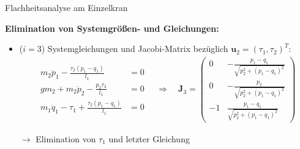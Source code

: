 \documentclass[
	ngerman,
	10pt,				%
	aspectratio=169, 	%
	xcolor=dvipsnames
]{beamer}
\begin{document}
\begin{frame}[t,fragile,label=Flachheit_Einzelkran_1]{\large Flachheitsanalyse am Einzelkran}
	
	\textbf{Elimination von Systemgrößen- und Gleichungen:}
	
	\begin{itemize}
		\item {($i = 3$) Systemgleichungen und Jacobi-Matrix bezüglich $\mathbf{u}_2 = (\tau_1, \tau_2)^T$:}
		\begin{align*}
		\begin{split}
		m_{2} \ddot{p}_{1} - \frac{\tau_{2} \left(p_{1} - q_{1}\right)}{l_{1}} &= 0\\
		g m_{2} + m_{2} \ddot{p}_{2} - \frac{p_{2} \tau_{2}}{l_{1}} &= 0\\
		m_{1} \ddot{q}_{1} - \tau_{1} + \frac{\tau_{2} \left(p_{1} - q_{1}\right)}{l_{1}} &= 0
		\end{split}
		\quad \Rightarrow \quad 
		\mathbf{J}_3 = 
		\left(\begin{matrix}
		0 & - \frac{p_{1} - q_{1}}{\sqrt{p_{2}^{2} + \left(p_{1} - q_{1}\right)^{2}}}\\
		0 & - \frac{p_{2}}{\sqrt{p_{2}^{2} + \left(p_{1} - q_{1}\right)^{2}}}\\
		-1 & \frac{p_{1} - q_{1}}{\sqrt{p_{2}^{2} + \left(p_{1} - q_{1}\right)^{2}}}
		\end{matrix}\right)
		\end{align*}
		\pause
		\item[$\rightarrow$] Elimination von $\tau_1$ und letzter Gleichung	
	\end{itemize}
	
\end{frame}

\end{document}
